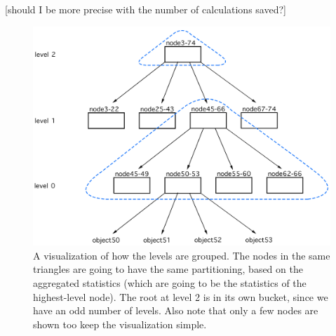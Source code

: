 [should I be more precise with the number of calculations saved?]

\begin{figure}[!htb]
  \centering
  \includegraphics[width=\textwidth,height=\textheight,keepaspectratio]{img/grouped-levels.png}
  \caption{ A visualization of how the levels are grouped. The nodes in the same triangles are going to have the same partitioning, based on the aggregated statistics (which are going to be the statistics of the highest-level node). The root at level 2 is in its own bucket, since we have an odd number of levels. Also note that only a few nodes are shown too keep the visualization simple.}
  \label{fig:Fixed-Size-buckets}
\end{figure}

